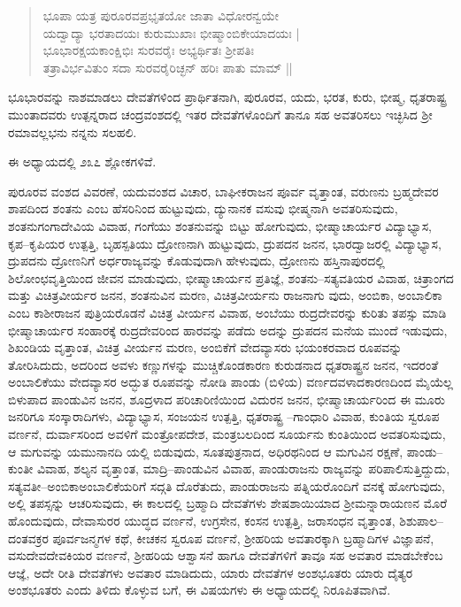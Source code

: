 \begin{verse}
ಭೂಪಾ ಯತ್ರ ಪುರೂರವಪ್ರಭೃತಯೋ ಜಾತಾ ವಿಧೋರನ್ವಯೇ\\ ಯದ್ವಾದ್ಯಾ ಭರತಾದಯಃ ಕುರುಮುಖಾಃ ಭೀಷ್ಮಾಂಬಿಕೇಯಾದಯಃ | \\ಭೂಭಾರಕ್ಷಯಕಾಂಕ್ಷಿಭಿಃ ಸುರವರೈಃ ಅಭ್ಯರ್ಥಿತಃ ಶ‍್ರೀಪತಿಃ\\ ತತ್ರಾವಿರ್ಭವಿತುಂ ಸದಾ ಸುರವರೈರಿಚ್ಛನ್ ಹರಿಃ ಪಾತು ಮಾಮ್ ||
\end{verse}

ಭೂಭಾರವನ್ನು ನಾಶಮಾಡಲು ದೇವತೆಗಳಿಂದ ಪ್ರಾರ್ಥಿತನಾಗಿ, ಪುರೂರವ, ಯದು, ಭರತ, ಕುರು, ಭೀಷ್ಮ, ಧೃತರಾಷ್ಟ್ರ ಮುಂತಾದವರು ಉತ್ಪನ್ನರಾದ ಚಂದ್ರವಂಶದಲ್ಲಿ ಇತರ ದೇವತೆಗಳೊಂದಿಗೆ ತಾನೂ ಸಹ ಅವತರಿಸಲು ಇಚ್ಛಿಸಿದ ಶ‍್ರೀ ರಮಾವಲ್ಲಭನು ನನ್ನನು ಸಲಹಲಿ.

ಈ ಅಧ್ಯಾಯದಲ್ಲಿ ೨೩೭ ಶ್ಲೋಕಗಳಿವೆ.

ಪುರೂರವ ವಂಶದ ವಿವರಣೆ, ಯದುವಂಶದ ವಿಚಾರ, ಬಾಘೀಕರಾಜನ ಪೂರ್ವ ವೃತ್ತಾಂತ, ವರುಣನು ಬ್ರಹ್ಮದೇವರ ಶಾಪದಿಂದ ಶಂತನು ಎಂಬ ಹೆಸರಿನಿಂದ ಹುಟ್ಟುವುದು, ದ್ಯುನಾನಕ ವಸುವು ಭೀಷ್ಮನಾಗಿ ಅವತರಿಸುವುದು, ಶಂತನುಗಂಗಾದೇವಿಯ ವಿವಾಹ, ಗಂಗೆಯು ಶಂತನುವನ್ನು ಬಿಟ್ಟು ಹೋಗುವುದು, ಭೀಷ್ಮಾಚಾರ್ಯರ ವಿದ್ಯಾಭ್ಯಾಸ, ಕೃಪ–ಕೃಪಿಯರ ಉತ್ಪತ್ತಿ, ಬೃಹಸ್ಪತಿಯು ದ್ರೋಣನಾಗಿ ಹುಟ್ಟುವುದು, ದ್ರುಪದನ ಜನನ, ಭಾರದ್ವಾಜರಲ್ಲಿ ವಿದ್ಯಾಭ್ಯಾಸ, ದ್ರುಪದನು ದ್ರೋಣನಿಗೆ ಅರ್ಧರಾಜ್ಯವನ್ನು ಕೊಡುವುದಾಗಿ ಹೇಳುವುದು, ದ್ರೋಣನು ಹಸ್ತಿನಾಪುರದಲ್ಲಿ ಶಿಲೋಂಛವೃತ್ತಿಯಿಂದ ಜೀವನ ಮಾಡುವುದು, ಭೀಷ್ಮಾಚಾರ್ಯನ ಪ್ರತಿಜ್ಞೆ, ಶಂತನು–ಸತ್ಯವತಿಯರ ವಿವಾಹ, ಚಿತ್ರಾಂಗದ ಮತ್ತು ವಿಚಿತ್ರವೀರ್ಯರ ಜನನ, ಶಂತನುವಿನ ಮರಣ, ವಿಚಿತ್ರವೀರ್ಯನು ರಾಜನಾಗು ವುದು, ಅಂಬಿಕಾ, ಅಂಬಾಲಿಕಾ ಎಂಬ ಕಾಶೀರಾಜನ ಪುತ್ರಿಯರೊಡನೆ ವಿಚಿತ್ರ ವೀರ್ಯನ ವಿವಾಹ, ಅಂಬೆಯು ರುದ್ರದೇವರನ್ನು ಕುರಿತು ತಪಸ್ಸು ಮಾಡಿ ಭೀಷ್ಮಾಚಾರ್ಯರ ಸಂಹಾರಕ್ಕೆ ರುದ್ರದೇವರಿಂದ ಹಾರವನ್ನು ಪಡೆದು ಅದನ್ನು ದ್ರುಪದನ ಮನೆಯ ಮುಂದೆ ಇಡುವುದು, ಶಿಖಂಡಿಯ ವೃತ್ತಾಂತ, ವಿಚಿತ್ರ ವೀರ್ಯನ ಮರಣ, ಅಂಬಿಕೆಗೆ ವೇದವ್ಯಾಸರು ಭಯಂಕರವಾದ ರೂಪವನ್ನು ತೋರಿಸಿದುದು, ಅದರಿಂದ ಅವಳು ಕಣ್ಣುಗಳನ್ನು ಮುಚ್ಚಿಕೊಂಡಕಾರಣ ಕುರುಡನಾದ ಧೃತರಾಷ್ಟ್ರನ ಜನನ, ಇದರಂತೆ ಅಂಬಾಲಿಕೆಯು ವೇದವ್ಯಾಸರ ಅದ್ಭುತ ರೂಪವನ್ನು ನೋಡಿ ಪಾಂಡು (ಬಿಳಿಯ) ವರ್ಣದವಳಾದಕಾರಣದಿಂದ ಮೈಯೆಲ್ಲ ಬಿಳುಪಾದ ಪಾಂಡುವಿನ ಜನನ, ಶೂದ್ರಳಾದ ಪರಿಚಾರಿಣಿಯಿಂದ ವಿದುರನ ಜನನ, ಭೀಷ್ಮಾಚಾರ್ಯರಿಂದ ಈ ಮೂರು ಜನರಿಗೂ ಸಂಸ್ಕಾರಾದಿಗಳು, ವಿದ್ಯಾಭ್ಯಾಸ, ಸಂಜಯನ ಉತ್ಪತ್ತಿ, ಧೃತರಾಷ್ಟ್ರ –ಗಾಂಧಾರಿ ವಿವಾಹ, ಕುಂತಿಯ ಸ್ವರೂಪ ವರ್ಣನೆ, ದುರ್ವಾಸರಿಂದ ಅವಳಿಗೆ ಮಂತ್ರೋಪದೇಶ, ಮಂತ್ರಬಲದಿಂದ ಸೂರ್ಯನು ಕುಂತಿಯಿಂದ ಅವತರಿಸುವುದು, ಆ ಮಗುವನ್ನು ಯಮುನಾನದಿ ಯಲ್ಲಿ ಬಿಡುವುದು, ಸೂತಪುತ್ರನಾದ, ಅಧಿರಥನಿಂದ ಆ ಮಗುವಿನ ರಕ್ಷಣೆ, ಪಾಂಡು–ಕುಂತೀ ವಿವಾಹ, ಶಲ್ಯನ ವೃತ್ತಾಂತ, ಮಾದ್ರಿ–ಪಾಂಡುವಿನ ವಿವಾಹ, ಪಾಂಡುರಾಜನು ರಾಜ್ಯವನ್ನು ಪರಿಪಾಲಿಸುತ್ತಿದ್ದುದು, ಸತ್ಯವತೀ–ಅಂಬಿಕಾಅಂಬಾಲಿಕೆಯರಿಗೆ ಸದ್ಗತಿ ದೊರೆತುದು, ಪಾಂಡುರಾಜನು ಪತ್ನಿಯರೊಂದಿಗೆ ವನಕ್ಕೆ ಹೋಗುವುದು, ಅಲ್ಲಿ ತಪಸ್ಸನ್ನು ಆಚರಿಸುವುದು, ಈ ಕಾಲದಲ್ಲಿ ಬ್ರಹ್ಮಾದಿ ದೇವತೆಗಳು ಶೇಷಶಾಯಿಯಾದ ಶ‍್ರೀಮನ್ನಾರಾಯಣನ ಮೊರೆ ಹೊಂದುವುದು, ದೇವಾಸುರರ ಯುದ್ಧದ ವರ್ಣನೆ, ಉಗ್ರಸೇನ, ಕಂಸನ ಉತ್ಪತ್ತಿ, ಜರಾಸಂಧನ ವೃತ್ತಾಂತ, ಶಿಶುಪಾಲ–ದಂತವಕ್ರರ ಪೂರ್ವಜನ್ಮಗಳ ಕಥೆ, ಕೀಚಕನ ಸ್ವರೂಪ ವರ್ಣನೆ, ಶ‍್ರೀಹರಿಯ ಅವತಾರಕ್ಕಾಗಿ ಬ್ರಹ್ಮಾದಿಗಳ ವಿಜ್ಞಾಪನೆ, ವಸುದೇವದೇವಕಿಯರ ವರ್ಣನೆ, ಶ‍್ರೀಹರಿಯ ಆಶ್ವಾಸನೆ ಹಾಗೂ ದೇವತೆಗಳಿಗೆ ತಾವೂ ಸಹ ಅವತಾರ ಮಾಡಬೇಕೆಂಬ ಆಜ್ಞೆ, ಅದೇ ರೀತಿ ದೇವತೆಗಳು ಅವತಾರ ಮಾಡಿದುದು, ಯಾರು ದೇವತೆಗಳ ಅಂಶಭೂತರು ಯಾರು ದೈತ್ಯರ ಅಂಶಭೂತರು ಎಂದು ತಿಳಿದು ಕೊಳ್ಳುವ ಬಗೆ, ಈ ವಿಷಯಗಳು ಈ ಅಧ್ಯಾಯದಲ್ಲಿ ನಿರೂಪಿತವಾಗಿವೆ.


